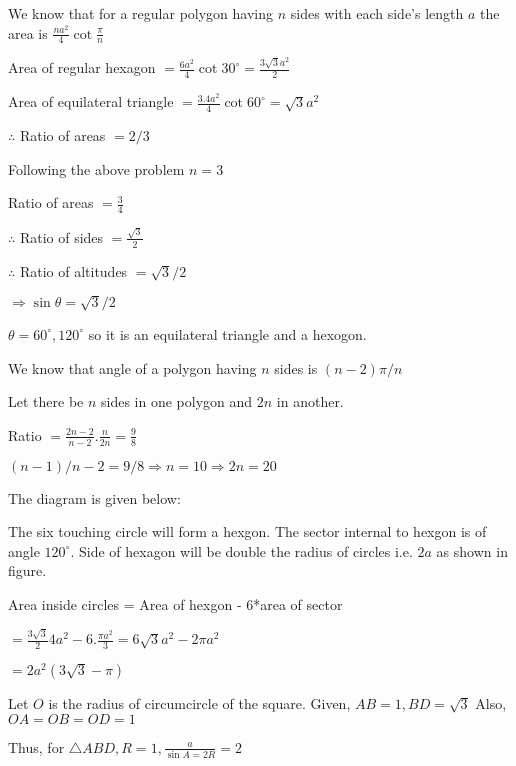   We know that for a regular polygon having $n$ sides with each side's length $a$ the area is
  $\frac{na^2}{4}\cot\frac{\pi}{n}$

  Area of regular hexagon $= \frac{6a^2}{4}\cot30^\circ = \frac{3\sqrt{3}a^2}{2}$

  Area of equilateral triangle $= \frac{3.4a^2}{4}\cot60^\circ = \sqrt{3}a^2$

  $\therefore$ Ratio of areas $= 2/3$

\item Following the above problem $n = 3$

\item Ratio of areas $= \frac{3}{4}$

  $\therefore$ Ratio of sides $= \frac{\sqrt{3}}{2}$

  $\therefore$ Ratio of altitudes $= \sqrt{3}/2$

  $\Rightarrow \sin\theta = \sqrt{3}/2$

  $\theta = 60^\circ, 120^\circ$ so it is an equilateral triangle and a hexogon.

\item We know that angle of a polygon having $n$ sides is $(n - 2)\pi/n$

  Let there be $n$ sides in one polygon and $2n$ in another.

  Ratio $= \frac{2n - 2}{n - 2}.\frac{n}{2n} = \frac{9}{8}$

  $(n - 1)/n - 2 = 9/8 \Rightarrow n = 10 \Rightarrow  2n = 20$

\item The diagram is given below:

  \startplacefigure
    \externalfigure[21_15.pdf]
  \stopplacefigure

  The six touching circle will form a hexgon. The sector internal to hexgon is of angle $120^\circ.$
  Side of hexagon will be double the radius of circles i.e. $2a$ as shown in figure.

  Area inside circles = Area of hexgon - 6*area of sector

  $= \frac{3\sqrt{3}}{2}4a^2 - 6.\frac{\pi a^2}{3} = 6\sqrt{3}a^2 - 2\pi a^2$

  $= 2a^2(3\sqrt{3} - \pi)$

\item Let $O$ is the radius of circumcircle of the square. Given,
  $AB = 1, BD = \sqrt{3}$ Also, $OA = OB = OD = 1$

  Thus, for $\triangle ABD, R = 1, \frac{a}{\sin A = 2R} = 2$

